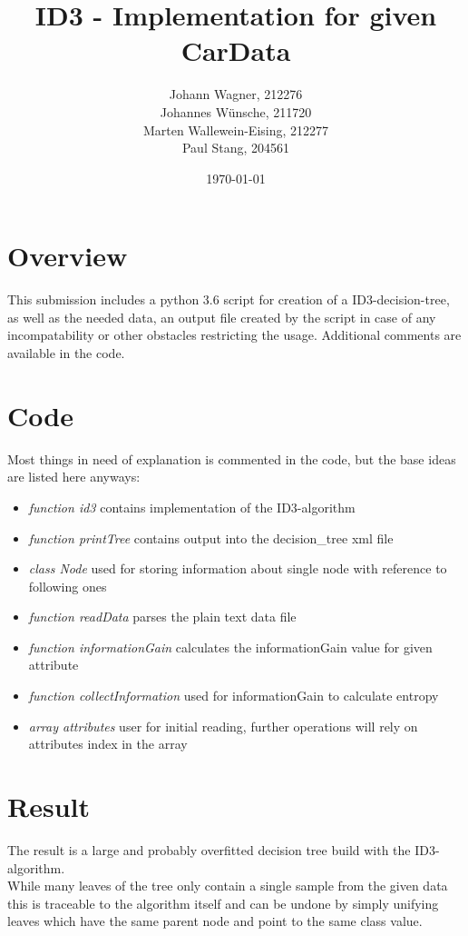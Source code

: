 \documentclass{article}
\begin{document}
\title{ID3 - Implementation for given CarData}
\author{Johann Wagner, 212276 \\ Johannes Wünsche, 211720 \\ Marten Wallewein-Eising, 212277 \\ Paul Stang, 204561}
\date{\today}
\maketitle

\section*{Overview}
This submission includes a python 3.6 script for creation of a ID3-decision-tree, as well as the needed data, an output file created by the script in case of any incompatability or other obstacles restricting the usage. Additional comments are available in the code.

\section*{Code}
Most things in need of explanation is commented in the code, but the base ideas are listed here anyways:\\
\begin{itemize}
\item \textit{function id3} contains implementation of the ID3-algorithm
\item \textit{function printTree} contains output into the decision\_tree xml file
\item \textit{class Node} used for storing information about single node with reference to following ones
\item \textit{function readData} parses the plain text data file
\item \textit{function informationGain} calculates the informationGain value for given attribute
\item \textit{function collectInformation} used for informationGain to calculate entropy
\item \textit{array attributes} user for initial reading, further operations will rely on attributes index in the array
\end{itemize}

\section*{Result}
The result is a large and probably overfitted decision tree build with the ID3-algorithm.\\
While many leaves of the tree only contain a single sample from the given data this is traceable to the algorithm itself and can be undone by simply unifying leaves which have the same parent node and point to the same class value. 
\end{document}
